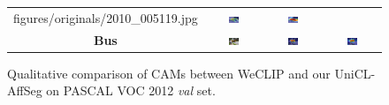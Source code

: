 \begin{figure}[ht]
\begin{tcolorbox}[colframe=black!60, colback=white, boxrule=0.8pt, arc=2pt, left=2pt, right=2pt, top=2pt, bottom=2pt]
\begin{tabular}{c c c c}
      {figures/originals/2010_005119.jpg}
       & \includegraphics[width=0.20\textwidth,height=0.20\textwidth]
      {figures/val_cams/weclip/2010_005119_6.jpg}
       & \includegraphics[width=0.20\textwidth,height=0.20\textwidth]
      {figures/val_cams/ours/2010_005119_6.jpg}
      \\
      \textbf{Bus}
       & \includegraphics[width=0.20\textwidth,height=0.20\textwidth]
      {figures/originals/2010_000148.jpg}
       & \includegraphics[width=0.20\textwidth,height=0.20\textwidth]
      {figures/val_cams/weclip/2010_000148_5.jpg}
       & \includegraphics[width=0.20\textwidth,height=0.20\textwidth]
      {figures/val_cams/ours/2010_000148_5.jpg}
      \\
    \end{tabular}
  \end{tcolorbox}

  \caption{Qualitative comparison of CAMs between WeCLIP and our UniCL-AffSeg on PASCAL VOC 2012 \textit{val} set.}
  \label{fig:qualitative_comparison_cam_val}
\end{figure}

